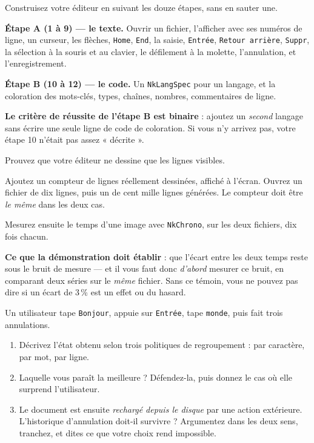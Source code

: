 \begin{nkpratique}
Construisez votre éditeur en suivant les douze étapes, sans en sauter une.

\textbf{Étape A (1 à 9) --- le texte.} Ouvrir un fichier, l'afficher avec ses
numéros de ligne, un curseur, les flèches, \texttt{Home}, \texttt{End}, la
saisie, \texttt{Entrée}, \texttt{Retour arrière}, \texttt{Suppr}, la sélection à
la souris et au clavier, le défilement à la molette, l'annulation, et
l'enregistrement.

\textbf{Étape B (10 à 12) --- le code.} Un \texttt{NkLangSpec} pour un langage,
et la coloration des mots-clés, types, chaînes, nombres, commentaires de ligne.

\textbf{Le critère de réussite de l'étape B est binaire} : ajoutez un
\emph{second} langage sans écrire une seule ligne de code de coloration. Si vous
n'y arrivez pas, votre étape 10 n'était pas assez « décrite ».
\end{nkpratique}

\begin{nkdemo}
Prouvez que votre éditeur ne dessine que les lignes visibles.

Ajoutez un compteur de lignes réellement dessinées, affiché à l'écran. Ouvrez un
fichier de dix lignes, puis un de cent mille lignes générées. Le compteur doit
être \emph{le même} dans les deux cas.

Mesurez ensuite le temps d'une image avec \texttt{NkChrono}, sur les deux
fichiers, dix fois chacun.

\textbf{Ce que la démonstration doit établir} : que l'écart entre les deux temps
reste sous le bruit de mesure --- et il vous faut donc \emph{d'abord} mesurer ce
bruit, en comparant deux séries sur le \emph{même} fichier. Sans ce témoin, vous
ne pouvez pas dire si un écart de 3\,\% est un effet ou du hasard.
\end{nkdemo}

\begin{nklogique}
Un utilisateur tape \texttt{Bonjour}, appuie sur \texttt{Entrée}, tape
\texttt{monde}, puis fait trois annulations.

\begin{enumerate}
\item Décrivez l'état obtenu selon trois politiques de regroupement : par
      caractère, par mot, par ligne.
\item Laquelle vous paraît la meilleure ? Défendez-la, puis donnez le cas où elle
      surprend l'utilisateur.
\item Le document est ensuite \emph{rechargé depuis le disque} par une action
      extérieure. L'historique d'annulation doit-il survivre ? Argumentez dans
      les deux sens, tranchez, et dites ce que votre choix rend impossible.
\end{enumerate}
\end{nklogique}
